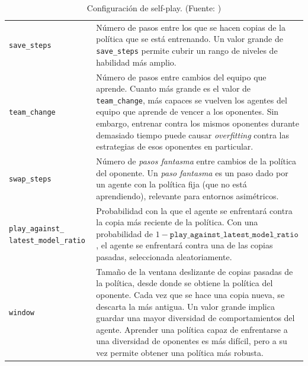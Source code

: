 \begin{table}[H]
\centering
    \begin{tabular}{|>{\rowmac}p{3.5cm}|>{\rowmac}p{10cm}<{\clearrow}|} 
        \hline
        \multicolumn{1}{|c|}{\textbf{Ajuste}} & \multicolumn{1}{c|}{\textbf{Descripción}} \\ \hline \hline
        \texttt{save\_steps} & Número de pasos entre los que se hacen copias de la política que se está entrenando. Un valor grande de \texttt{save\_steps} permite cubrir un rango de niveles de habilidad más amplio. \\
        \hline
        \texttt{team\_change} & Número de pasos entre cambios del equipo que aprende. Cuanto más grande es el valor de \texttt{team\_change}, más capaces se vuelven los agentes del equipo que aprende de vencer a los oponentes. Sin embargo, entrenar contra los mismos oponentes durante demasiado tiempo puede causar \emph{overfitting} contra las estrategias de esos oponentes en particular.\\
        \hline
        \texttt{swap\_steps} & Número de \emph{pasos fantasma} entre cambios de la política del oponente. Un \emph{paso fantasma} es un paso dado por un agente con la política fija (que no está aprendiendo), relevante para entornos asimétricos. \\
        \hline
        \texttt{play\_against\_ latest\_model\_ratio} & Probabilidad con la que el agente se enfrentará contra la copia más reciente de la política. Con una probabilidad de $1 - \texttt{play\_against\_latest\_model\_ratio}$, el agente se enfrentará contra una de las copias pasadas, seleccionada aleatoriamente. \\
        \hline
        \texttt{window} & Tamaño de la ventana deslizante de copias pasadas de la política, desde donde se obtiene la política del oponente. Cada vez que se hace una copia nueva, se descarta la más antigua. Un valor grande implica guardar una mayor diversidad de comportamientos del agente. Aprender una política capaz de enfrentarse a una diversidad de oponentes es más difícil, pero a su vez permite obtener una política más robusta. \\
        \hline
    \end{tabular}
    \caption[Configuración de self-play]{Configuración de self-play. (Fuente: \cite{ml-agents-config-file})}
    \label{tab:config-self-play}
\end{table}
